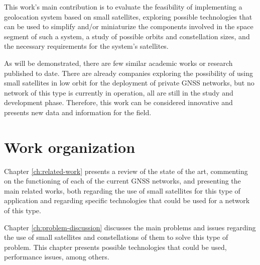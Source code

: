 This work's main contribution is to evaluate the feasibility of implementing a geolocation system based on small satellites, exploring possible technologies that can be used to simplify and/or miniaturize the components involved in the space segment of such a system, a study of possible orbits and constellation sizes, and the necessary requirements for the system's satellites.

As will be demonstrated, there are few similar academic works or research published to date. There are already companies exploring the possibility of using small satellites in low orbit for the deployment of private GNSS networks, but no network of this type is currently in operation, all are still in the study and development phase. Therefore, this work can be considered innovative and presents new data and information for the field.

\section{Work organization}




Chapter \ref{ch:related-work} presents a review of the state of the art, commenting on the functioning of each of the current GNSS networks, and presenting the main related works, both regarding the use of small satellites for this type of application and regarding specific technologies that could be used for a network of this type.

Chapter \ref{ch:problem-discussion} discusses the main problems and issues regarding the use of small satellites and constellations of them to solve this type of problem. This chapter presents possible technologies that could be used, performance issues, among others.

